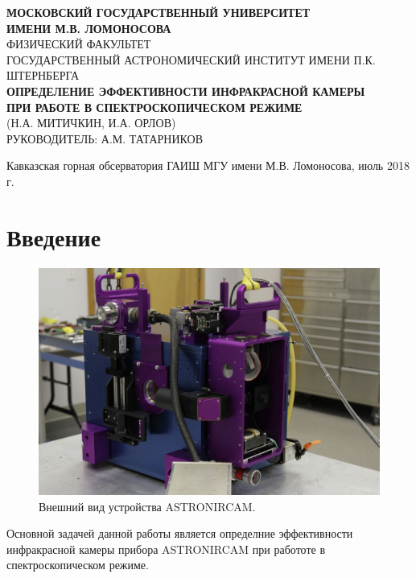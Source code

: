 \documentclass[a4paper]{article}
\begin{document}
\setcounter{page}{0} 
\begin{titlepage}
\begin{center}
\large{\textbf{МОСКОВСКИЙ ГОСУДАРСТВЕННЫЙ УНИВЕРСИТЕТ\\ИМЕНИ М.В. ЛОМОНОСОВА}}\\
\hfill\break
\normalsize{ФИЗИЧЕСКИЙ ФАКУЛЬТЕТ}\\
\hfill\break
\normalsize{ГОСУДАРСТВЕННЫЙ АСТРОНОМИЧЕСКИЙ ИНСТИТУТ ИМЕНИ П.К. ШТЕРНБЕРГА}\\
\hfill\break
\hfill\break
\hfill\break
\hfill\break
\hfill\break
\hfill\break
\hfill\break
\hfill\break
\hfill\break
\hfill\break
\Large{\textbf{ОПРЕДЕЛЕНИЕ ЭФФЕКТИВНОСТИ ИНФРАКРАСНОЙ КАМЕРЫ\\ПРИ РАБОТЕ В СПЕКТРОСКОПИЧЕСКОМ РЕЖИМЕ}}\\
\hfill\break
\normalsize{(Н.А. МИТИЧКИН, И.А. ОРЛОВ)}\\
\hfill\break
\normalsize{РУКОВОДИТЕЛЬ: А.М. ТАТАРНИКОВ}\\
\end{center}
\hfill\break
\hfill\break
\hfill\break
\hfill\break
\hfill\break
\hfill\break
\hfill\break
\hfill\break
\hfill\break
\hfill\break
\hfill\break
\hfill\break
\hfill\break
\hfill\break
\hfill\break
\hfill\break 
\hfill\break
\hfill\break
\hfill\break
\begin{center}
Кавказская горная обсерватория ГАИШ МГУ имени М.В. Ломоносова, июль 2018 г.
\end{center}
\thispagestyle{empty}
\end{titlepage}
\newpage
\tableofcontents
\newpage
\section{Введение}
\begin{figure} 
\vspace{-4ex}
\includegraphics[width=\linewidth]{11}
\caption{Внешний вид устройства ASTRONIRCAM.}
\label{fig:1}
\end{figure}
Основной задачей данной работы является определние эффективности инфракрасной камеры прибора ASTRONIRCAM при работоте в спектроскопическом режиме.
\end{document}

